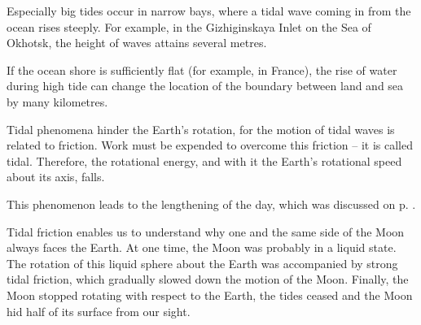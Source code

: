 Especially big tides occur in narrow bays, where a tidal
wave coming in from the ocean rises steeply. For example,
in the Gizhiginskaya Inlet on the Sea of Okhotsk, the
height of waves attains several metres.

If the ocean shore is sufficiently flat (for example, in
France), the rise of water during high tide can change the
location of the boundary between land and sea by many
kilometres.

Tidal phenomena hinder the Earth's rotation, for the
motion of tidal waves is related to friction. Work must
be expended to overcome this friction -- it is called tidal.
Therefore, the rotational energy, and with it the Earth's
rotational speed about its axis, falls.

This phenomenon leads to the lengthening of the day,
which was discussed on p. \pageref{longer-day}.

Tidal friction enables us to understand why one and
the same side of the Moon always faces the Earth.
At one time, the Moon was probably in a liquid state.
The rotation of this liquid sphere about the Earth was
accompanied by strong tidal friction, which gradually
slowed down the motion of the Moon. Finally, the Moon
stopped rotating with respect to the Earth, the tides
ceased and the Moon hid half of its surface from our
sight.

